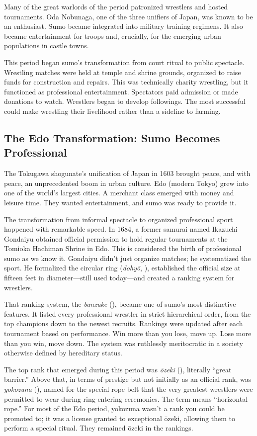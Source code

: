 Many of the great warlords of the period patronized wrestlers and hosted tournaments. Oda Nobunaga, one of the three unifiers of Japan, was known to be an enthusiast. Sumo became integrated into military training regimens. It also became entertainment for troops and, crucially, for the emerging urban populations in castle towns.

This period began sumo's transformation from court ritual to public spectacle. Wrestling matches were held at temple and shrine grounds, organized to raise funds for construction and repairs. This was technically charity wrestling, but it functioned as professional entertainment. Spectators paid admission or made donations to watch. Wrestlers began to develop followings. The most successful could make wrestling their livelihood rather than a sideline to farming.

\subsection{The Edo Transformation: Sumo Becomes Professional}

The Tokugawa shogunate's unification of Japan in 1603 brought peace, and with peace, an unprecedented boom in urban culture. Edo (modern Tokyo) grew into one of the world's largest cities. A merchant class emerged with money and leisure time. They wanted entertainment, and sumo was ready to provide it.

The transformation from informal spectacle to organized professional sport happened with remarkable speed. In 1684, a former samurai named Ikazuchi Gondaiyu obtained official permission to hold regular tournaments at the Tomioka Hachiman Shrine in Edo. This is considered the birth of professional sumo as we know it. Gondaiyu didn't just organize matches; he systematized the sport. He formalized the circular ring (\textit{dohyō}, ), established the official size at fifteen feet in diameter—still used today—and created a ranking system for wrestlers.

That ranking system, the \textit{banzuke} (), became one of sumo's most distinctive features. It listed every professional wrestler in strict hierarchical order, from the top champions down to the newest recruits. Rankings were updated after each tournament based on performance. Win more than you lose, move up. Lose more than you win, move down. The system was ruthlessly meritocratic in a society otherwise defined by hereditary status.

The top rank that emerged during this period was \textit{ōzeki} (), literally ``great barrier.'' Above that, in terms of prestige but not initially as an official rank, was \textit{yokozuna} (), named for the special rope belt that the very greatest wrestlers were permitted to wear during ring-entering ceremonies. The term means ``horizontal rope.'' For most of the Edo period, yokozuna wasn't a rank you could be promoted to; it was a license granted to exceptional ōzeki, allowing them to perform a special ritual. They remained ōzeki in the rankings.

